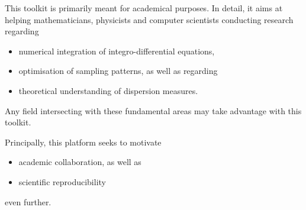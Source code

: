 %
This toolkit is primarily meant for academical purposes. In detail, it aims at helping mathematicians, physicists and computer scientists conducting research regarding
\begin{itemize}
  \item numerical integration of integro-differential equations,
  \item optimisation of sampling patterns, as well as regarding
  \item theoretical understanding of dispersion measures.
\end{itemize}
Any field intersecting with these fundamental areas may take advantage with this toolkit.

Principally, this platform seeks to motivate
\begin{itemize}
  \item academic collaboration, as well as
  \item scientific reproducibility
\end{itemize}
even further.
